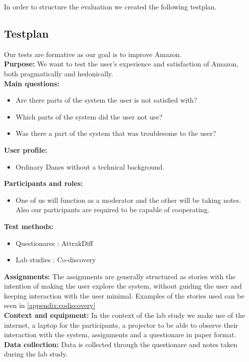In order to structure the evaluation we created the following testplan.

\subsection{Testplan}
Our tests are formative as our goal is to improve Amazon. \\
\textbf{Purpose:} We want to test the user's experience and satisfaction of Amazon, both pragmatically and hedonically. \\
\textbf{Main questions:}
\begin{itemize}
\item Are there parts of the system the user is not satisfied with?
\item Which parts of the system did the user not use?
\item Was there a part of the system that was troublesome to the user?
\end{itemize}
\textbf{User profile:}
\begin{itemize}
\item Ordinary Danes without a technical background.
\end{itemize}
\textbf{Participants and roles:}
\begin{itemize}
\item One of us will function as a moderator and the other will be taking notes. Also our participants are required to be capable of cooperating.
\end{itemize}
\textbf{Test methods:}
\begin{itemize}
\item Questionares : AttrakDiff
\item Lab studies : Co-discovery
\end{itemize}
\textbf{Assignments:} The assignments are generally structured as stories with the intention of making the user explore the system, without guiding the user and keeping interaction with the user minimal. Examples of the stories used can be seen in \autoref{appendix:codiscovery} \\
\textbf{Context and equipment:} In the context of the lab study we make use of the internet, a laptop for the participants, a projector to be able to observe their interaction with the system, assignments and a questionare in paper format. \\
\textbf{Data collection:} Data is collected through the questionare and notes taken during the lab study.

